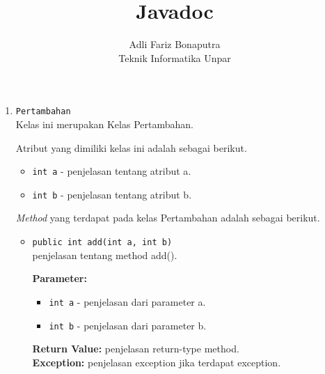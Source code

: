 \documentclass{article}
\title{Javadoc}
\author{Adli Fariz Bonaputra \\ Teknik Informatika Unpar}
\begin{document}
\maketitle
\begin{enumerate}
	\item \texttt{Pertambahan}\\
	Kelas ini merupakan Kelas Pertambahan.
	
	Atribut yang dimiliki kelas ini adalah sebagai berikut.
	\begin{itemize}
		\item \texttt{int a} -
		{penjelasan tentang atribut a}.
		\item \texttt{int b} -
		{penjelasan tentang atribut b}.
	\end{itemize}
	
	{\it Method} yang terdapat pada kelas Pertambahan adalah sebagai berikut.
	\begin{itemize}
		\item \texttt{public int add(int a, int b)}\\
		{penjelasan tentang method add()}.
		
		\textbf{Parameter:}
		\begin{itemize}
			\item \texttt{int a} - 
			{penjelasan dari parameter a}.
			\item \texttt{int b} - 
			{penjelasan dari parameter b}.
		\end{itemize}
		
		\textbf{Return Value:} {penjelasan return-type method}.\\
		\textbf{Exception:} {penjelasan exception jika terdapat exception}.
	\end{itemize}
\end{enumerate}
\end{document}
